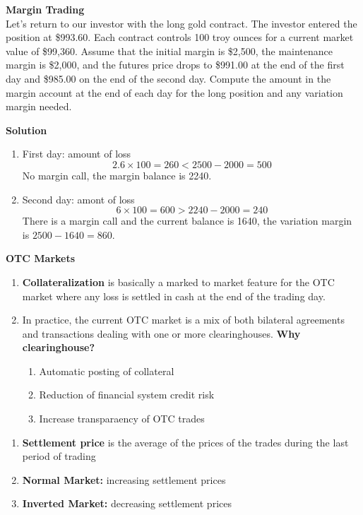 \documentclass[11pt,fleqn]{book} %
\numberwithin{equation}{section} %
\numberwithin{figure}{section} %
\numberwithin{table}{section} %
\begin{document}
\begin{exercise}\textbf{Margin Trading}\\
Let’s return to our investor with the long gold contract. The investor entered the position
at \$993.60. Each contract controls 100 troy ounces for a current market value of \$99,360.
Assume that the initial margin is \$2,500, the maintenance margin is \$2,000, and the
futures price drops to \$991.00 at the end of the first day and \$985.00 on the end of the
second day. Compute the amount in the margin account at the end of each day for the
long position and any variation margin needed.

\textbf{Solution}
\begin{enumerate}
    \item First day: amount of loss
    $$
    2.6\times 100=260<2500-2000=500
    $$
    No margin call, the margin balance is 2240.
    \item Second day: amont of loss
    $$
    6\times 100=600>2240-2000=240
    $$
    There is a margin call and the current balance is 1640, the variation margin is $2500-1640=860$.
\end{enumerate}
\end{exercise}
\begin{definition}\textbf{OTC Markets}
\begin{enumerate}
    \item \textbf{Collateralization} is basically a marked to market feature for the OTC market where any loss is settled in cash at the end of the trading day. 
    \item In practice, the current OTC
market is a mix of both bilateral agreements and transactions dealing with one or more
clearinghouses. \textbf{Why clearinghouse?}
    \begin{enumerate}
        \item Automatic posting of collateral
        \item Reduction of financial system credit risk
        \item Increase transparaency of OTC trades
    \end{enumerate}
\end{enumerate}
\end{definition}
\begin{definition}
\begin{enumerate}
    \item \textbf{Settlement price} is the average of the prices of the trades during the last period of trading
    \item \textbf{Normal Market:} increasing settlement prices
    \item \textbf{Inverted Market:} decreasing settlement prices
\end{enumerate}
\end{definition}
\end{document}
